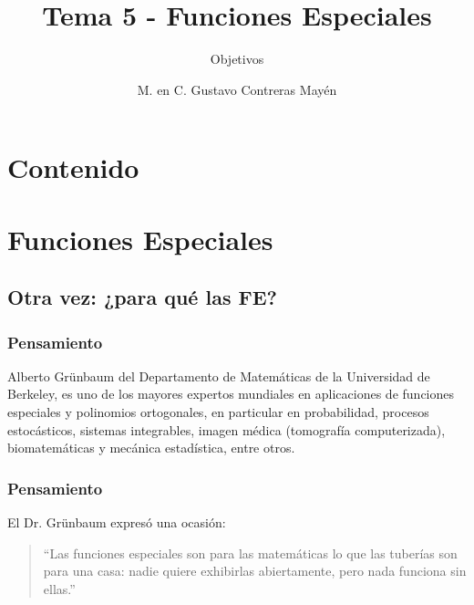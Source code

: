 
\title{\large{Tema 5 - Funciones Especiales}}
\subtitle{Objetivos}
\author{M. en C. Gustavo Contreras Mayén}
\date{}

\maketitle
\fontsize{14}{14}\selectfont
{}
\section*{Contenido}
\section{Funciones Especiales}
\subsection{Otra vez: ¿para qué las FE?}
\begin{frame}
\frametitle{Pensamiento}
Alberto Grünbaum del Departamento de Matemáticas de la Universidad de Berkeley, es uno de los mayores expertos mundiales en aplicaciones de funciones especiales y polinomios ortogonales, en particular en probabilidad, procesos estocásticos, sistemas integrables, imagen médica (tomografía computerizada), biomatemáticas y mecánica estadística, entre otros.
\end{frame}
\begin{frame}
\frametitle{Pensamiento}
El Dr. Grünbaum expresó una ocasión:
\\
\bigskip
\pause
\begin{quote}
\enquote{Las funciones especiales son para las matemáticas lo que las tuberías son para una casa: nadie quiere exhibirlas abiertamente, pero nada funciona sin ellas.}
\end{quote}
\end{frame}
